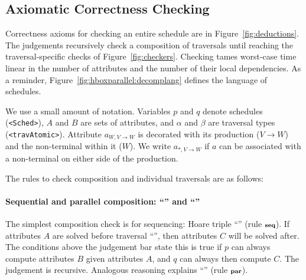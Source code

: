 

\subsection{Axiomatic Correctness Checking}


Correctness axioms for checking an entire schedule are in Figure~\ref{fig:deductions}. The judgements recursively check a composition of traversals until reaching the traversal-specific checks of Figure~\ref{fig:checkers}. Checking tames worst-case time linear in the number of attributes and the number of their local dependencies. As a reminder, Figure~\ref{fig:hboxparallel:decomplang} defines the language of schedules.

We use a small amount of notation. Variables $p$ and $q$ denote schedules (\lstinline{<Sched>}), $A$ and $B$ are sets of attributes, and $\alpha$ and $\beta$ are traversal types (\lstinline{<travAtomic>}). Attribute $a_{W, V{\rightarrow}W}$ is decorated with its production ($V{\rightarrow}W$) and the non-terminal within it ($W$). We write  $a_{*, V{\rightarrow}W}$ if $a$ can be associated with a non-terminal on either side of the production.

The rules to check composition and individual traversals are as follows:

\paragraph*{Sequential and parallel composition: ``\sched{;}'' and ``\sched{||}''}The simplest composition check is for sequencing: Hoare triple ``'' (rule ${\scriptstyle\textbf {seq}}$).  If attributes $A$ are solved before traversal ``'', then attributes $C$ will be solved after. The conditions above the judgement bar state this is true if $p$ can always compute attributes $B$ given attributes $A$, and $q$ can always then compute $C$. The judgement is recursive. Analogous reasoning explains  ``\sched{||}'' (rule ${\scriptstyle\textbf {par}}$).


